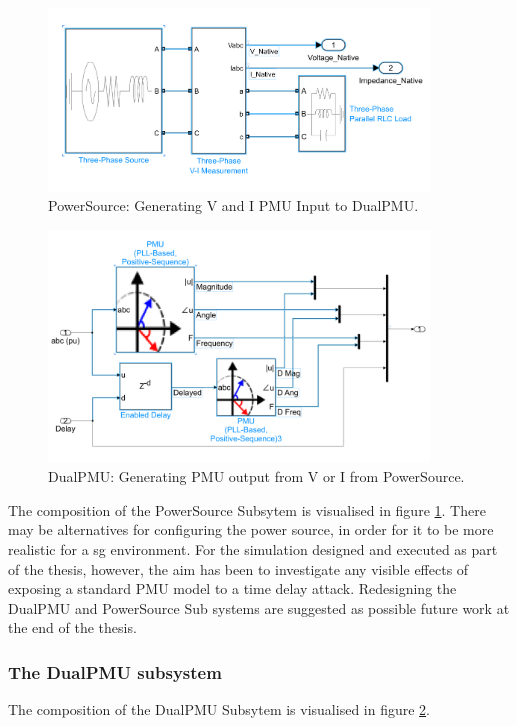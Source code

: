  \begin{figure}
\includegraphics[width=0.9\textwidth]{figures/PowerSourceSubsystem.png}
\caption[PowerSource SIMULINK subsystem]{PowerSource: Generating  V and I PMU Input to DualPMU.}
\label{fig:PowerSource}
\end{figure}
  \begin{figure}
\includegraphics[width=0.9\textwidth]{figures/DualPMUsubsystem.png}
\caption[DualPMU SIMULINK subsystem]{DualPMU: Generating PMU output from V or I from PowerSource.}
\label{fig:DualPMU}
\end{figure}
The composition of the PowerSource Subsytem is visualised in figure \ref{fig:PowerSource}.
There may be alternatives for configuring the power source, in order for it to be more realistic for a \acrlong{sg} environment.
For the simulation designed and executed as part of the thesis, however, the aim has been to investigate any visible effects of exposing a standard PMU model to a time delay attack. Redesigning the DualPMU and PowerSource Sub systems are suggested as possible future work at the end of the thesis.
\subsubsection{The DualPMU subsystem}
The composition of the DualPMU Subsytem is visualised in figure \ref{fig:DualPMU}. 


